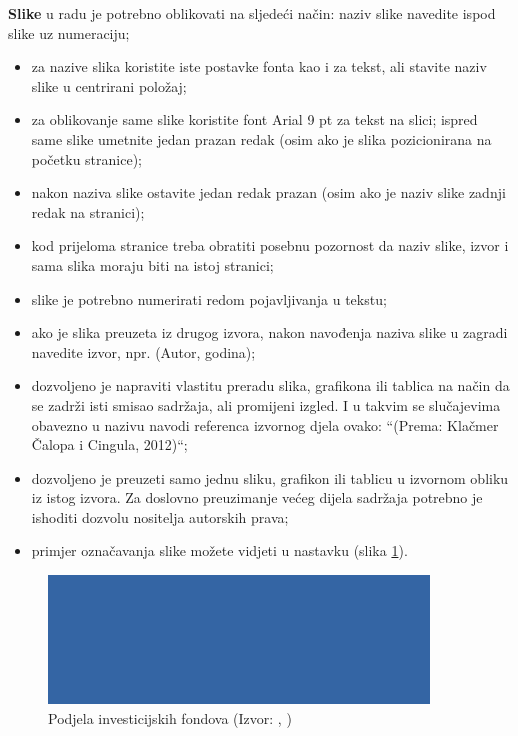 \documentclass{foi}
\begin{document}
\begin{flushleft}\textbf{Slike} u radu je potrebno oblikovati na sljedeći način:
naziv slike navedite ispod slike uz numeraciju;\end{flushleft}

\begin{itemize}
    \item za nazive slika koristite iste postavke fonta kao i za tekst, ali stavite naziv slike u centrirani položaj;

    \item za oblikovanje same slike koristite font Arial 9 pt za tekst na slici;
ispred same slike umetnite jedan prazan redak (osim ako je slika pozicionirana na početku stranice);

    \item nakon naziva slike ostavite jedan redak prazan (osim ako je naziv slike zadnji redak na stranici);

    \item kod prijeloma stranice treba obratiti posebnu pozornost da naziv slike, izvor i sama slika moraju biti na istoj stranici; 

    \item slike je potrebno numerirati redom pojavljivanja u tekstu;

    \item ako je slika preuzeta iz drugog izvora, nakon navođenja naziva slike u zagradi navedite izvor, npr. (Autor, godina);

    \item dozvoljeno je napraviti vlastitu preradu slika, grafikona ili tablica na način da se zadrži isti smisao sadržaja, ali promijeni izgled. I u takvim se slučajevima obavezno u nazivu navodi referenca izvornog djela ovako: “(Prema: Klačmer Čalopa i Cingula, 2012)“;

    \item dozvoljeno je preuzeti samo jednu sliku, grafikon ili tablicu u izvornom obliku iz istog izvora. Za doslovno preuzimanje većeg dijela sadržaja potrebno je ishoditi dozvolu nositelja autorskih prava;

    \item primjer označavanja slike možete vidjeti u nastavku (slika \ref{fig:podjela}).
\end{itemize}

\begin{figure}[h!]
    \centering
    \includegraphics[width=0.9\textwidth]{slike/slika.png}
    \caption{Podjela investicijskih fondova (Izvor: \citeauthor{Aranda2009}, \citeyear{Aranda2009})}
    \label{fig:podjela}
\end{figure}
\end{document}
